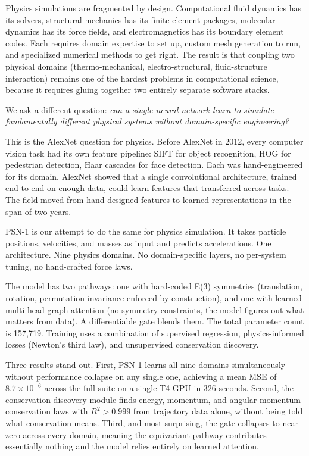 \documentclass[10pt,twocolumn]{article}
\begin{document}
Physics simulations are fragmented by design. Computational fluid dynamics has its solvers, structural mechanics has its finite element packages, molecular dynamics has its force fields, and electromagnetics has its boundary element codes. Each requires domain expertise to set up, custom mesh generation to run, and specialized numerical methods to get right. The result is that coupling two physical domains (thermo-mechanical, electro-structural, fluid-structure interaction) remains one of the hardest problems in computational science, because it requires gluing together two entirely separate software stacks.

We ask a different question: \emph{can a single neural network learn to simulate fundamentally different physical systems without domain-specific engineering?}

This is the AlexNet question for physics. Before AlexNet in 2012, every computer vision task had its own feature pipeline: SIFT for object recognition, HOG for pedestrian detection, Haar cascades for face detection. Each was hand-engineered for its domain. AlexNet showed that a single convolutional architecture, trained end-to-end on enough data, could learn features that transferred across tasks. The field moved from hand-designed features to learned representations in the span of two years.

PSN-1 is our attempt to do the same for physics simulation. It takes particle positions, velocities, and masses as input and predicts accelerations. One architecture. Nine physics domains. No domain-specific layers, no per-system tuning, no hand-crafted force laws.

The model has two pathways: one with hard-coded E(3) symmetries (translation, rotation, permutation invariance enforced by construction), and one with learned multi-head graph attention (no symmetry constraints, the model figures out what matters from data). A differentiable gate blends them. The total parameter count is 157,719. Training uses a combination of supervised regression, physics-informed losses (Newton's third law), and unsupervised conservation discovery.

Three results stand out. First, PSN-1 learns all nine domains simultaneously without performance collapse on any single one, achieving a mean MSE of $8.7 \times 10^{-6}$ across the full suite on a single T4 GPU in 326 seconds. Second, the conservation discovery module finds energy, momentum, and angular momentum conservation laws with $R^2 > 0.999$ from trajectory data alone, without being told what conservation means. Third, and most surprising, the gate collapses to near-zero across every domain, meaning the equivariant pathway contributes essentially nothing and the model relies entirely on learned attention.
\end{document}
